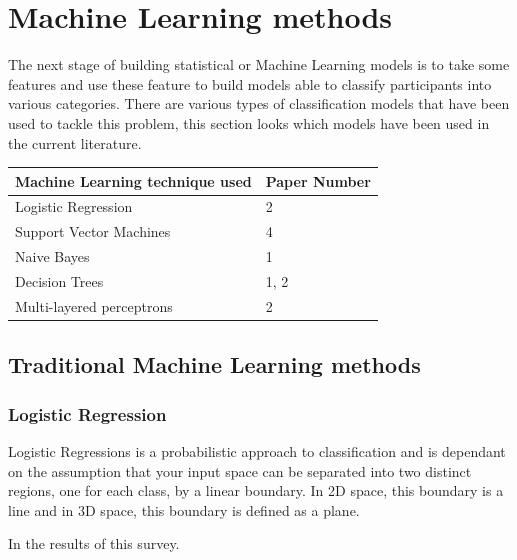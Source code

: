 \section{Machine Learning methods}
The next stage of building statistical or Machine Learning models is to take some features and use these feature to build models able to classify participants into various categories. There are various types of classification models that have been used to tackle this problem, this section looks which models have been used in the current literature.

\begin{table}[H]
	\begin{center}
	\begin{tabular}{ p{6cm} | p{6cm} }
	\hline
	Machine Learning technique used & Paper Number \\ \hline
	Logistic Regression & 2 \\ \hline
	Support Vector Machines & 4 \\ \hline
	Naive Bayes & 1 \\ \hline
	Decision Trees & 1, 2 \\ \hline
	Multi-layered perceptrons & 2 \\ \hline
	\hline 
	\end{tabular}
	\end{center}
\end{table}

\subsection{Traditional Machine Learning methods}
\subsubsection{Logistic Regression}
Logistic Regressions is a probabilistic approach to classification and is dependant on the assumption that your input space can be separated into two distinct regions, one for each class, by a linear boundary. In 2D space, this boundary is a line and in 3D space, this boundary is defined as a plane. 
\par 
In the results of this survey.


